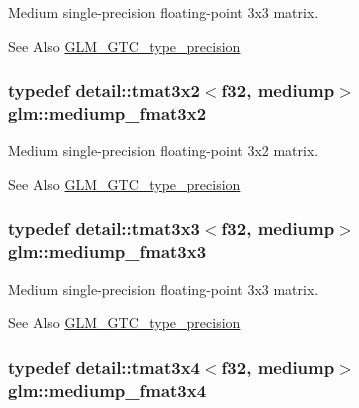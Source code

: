 Medium single-\/precision floating-\/point 3x3 matrix. \begin{DoxySeeAlso}{See Also}
\hyperlink{group__gtc__type__precision}{G\-L\-M\-\_\-\-G\-T\-C\-\_\-type\-\_\-precision} 
\end{DoxySeeAlso}
\hypertarget{group__gtc__type__precision_ga40681f25413b8705b16da2f534692f59}{
\subsubsection[{mediump\-\_\-fmat3x2}]{\setlength{\rightskip}{0pt plus 5cm}typedef detail\-::tmat3x2$<$f32, mediump$>$ {\bf glm\-::mediump\-\_\-fmat3x2}}}\label{group__gtc__type__precision_ga40681f25413b8705b16da2f534692f59}
Medium single-\/precision floating-\/point 3x2 matrix. \begin{DoxySeeAlso}{See Also}
\hyperlink{group__gtc__type__precision}{G\-L\-M\-\_\-\-G\-T\-C\-\_\-type\-\_\-precision} 
\end{DoxySeeAlso}
\hypertarget{group__gtc__type__precision_gaa7f015dd5b962a658178bb881d4620cc}{
\subsubsection[{mediump\-\_\-fmat3x3}]{\setlength{\rightskip}{0pt plus 5cm}typedef detail\-::tmat3x3$<$f32, mediump$>$ {\bf glm\-::mediump\-\_\-fmat3x3}}}\label{group__gtc__type__precision_gaa7f015dd5b962a658178bb881d4620cc}
Medium single-\/precision floating-\/point 3x3 matrix. \begin{DoxySeeAlso}{See Also}
\hyperlink{group__gtc__type__precision}{G\-L\-M\-\_\-\-G\-T\-C\-\_\-type\-\_\-precision} 
\end{DoxySeeAlso}
\hypertarget{group__gtc__type__precision_gafa5aaa948365f349840dfeb9eeebf0cd}{
\subsubsection[{mediump\-\_\-fmat3x4}]{\setlength{\rightskip}{0pt plus 5cm}typedef detail\-::tmat3x4$<$f32, mediump$>$ {\bf glm\-::mediump\-\_\-fmat3x4}}}\label{group__gtc__type__precision_gafa5aaa948365f349840dfeb9eeebf0cd}
